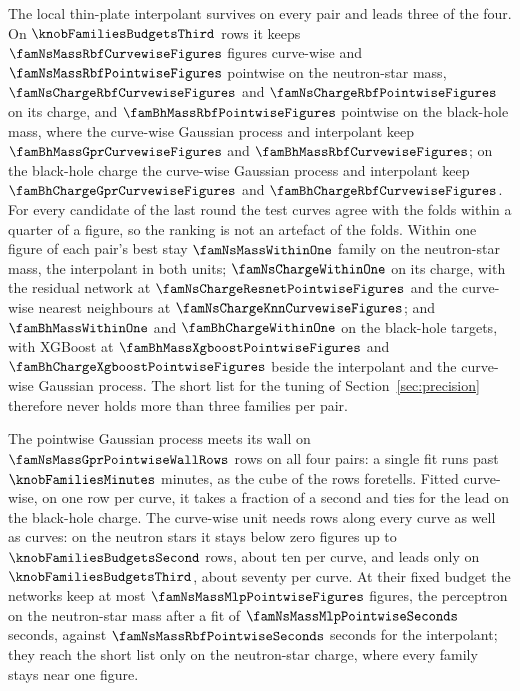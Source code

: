 The local thin-plate interpolant survives on every pair and leads three of the four. On $\knobFamiliesBudgetsThird$ rows it keeps $\famNsMassRbfCurvewiseFigures$ figures curve-wise and $\famNsMassRbfPointwiseFigures$ pointwise on the neutron-star mass, $\famNsChargeRbfCurvewiseFigures$ and $\famNsChargeRbfPointwiseFigures$ on its charge, and $\famBhMassRbfPointwiseFigures$ pointwise on the black-hole mass, where the curve-wise Gaussian process and interpolant keep $\famBhMassGprCurvewiseFigures$ and $\famBhMassRbfCurvewiseFigures$; on the black-hole charge the curve-wise Gaussian process and interpolant keep $\famBhChargeGprCurvewiseFigures$ and $\famBhChargeRbfCurvewiseFigures$. For every candidate of the last round the test curves agree with the folds within a quarter of a figure, so the ranking is not an artefact of the folds. Within one figure of each pair's best stay $\famNsMassWithinOne$ family on the neutron-star mass, the interpolant in both units; $\famNsChargeWithinOne$ on its charge, with the residual network at $\famNsChargeResnetPointwiseFigures$ and the curve-wise nearest neighbours at $\famNsChargeKnnCurvewiseFigures$; and $\famBhMassWithinOne$ and $\famBhChargeWithinOne$ on the black-hole targets, with XGBoost at $\famBhMassXgboostPointwiseFigures$ and $\famBhChargeXgboostPointwiseFigures$ beside the interpolant and the curve-wise Gaussian process. The short list for the tuning of Section~\ref{sec:precision} therefore never holds more than three families per pair.

The pointwise Gaussian process meets its wall on $\famNsMassGprPointwiseWallRows$ rows on all four pairs: a single fit runs past $\knobFamiliesMinutes$ minutes, as the cube of the rows foretells. Fitted curve-wise, on one row per curve, it takes a fraction of a second and ties for the lead on the black-hole charge. The curve-wise unit needs rows along every curve as well as curves: on the neutron stars it stays below zero figures up to $\knobFamiliesBudgetsSecond$ rows, about ten per curve, and leads only on $\knobFamiliesBudgetsThird$, about seventy per curve. At their fixed budget the networks keep at most $\famNsMassMlpPointwiseFigures$ figures, the perceptron on the neutron-star mass after a fit of $\famNsMassMlpPointwiseSeconds$ seconds, against $\famNsMassRbfPointwiseSeconds$ seconds for the interpolant; they reach the short list only on the neutron-star charge, where every family stays near one figure.

